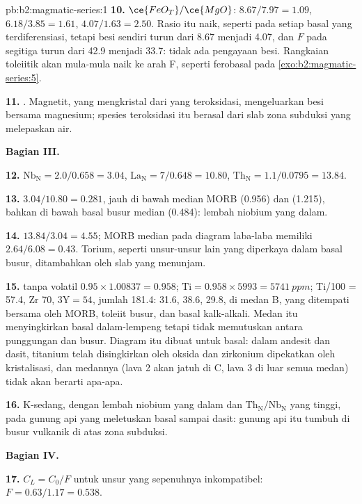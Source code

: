\begin{solution}{pb:b2:magmatic-series:1}
\textbf{10.} $\ce{FeO_T}/\ce{MgO}$: $8.67/7.97 = 1.09$, $6.18/3.85 = 1.61$, $4.07/1.63 =
2.50$. Rasio itu naik, seperti pada setiap basal yang terdiferensiasi, tetapi besi sendiri
turun dari 8.67 menjadi 4.07, dan $F$ pada segitiga turun dari 42.9 menjadi 33.7: tidak ada pengayaan
besi. Rangkaian toleiitik akan mula-mula naik ke arah F, seperti ferobasal pada
\cref{exo:b2:magmatic-series:5}.

\textbf{11.} . Magnetit, yang mengkristal dari  yang teroksidasi,
mengeluarkan besi bersama magnesium; spesies teroksidasi itu berasal dari slab zona subduksi
yang melepaskan air.

\noindent\textbf{Bagian III.}

\textbf{12.} $\mathrm{Nb_N} = 2.0/0.658 = 3.04$, $\mathrm{La_N} = 7/0.648 = 10.80$,
$\mathrm{Th_N} = 1.1/0.0795 = 13.84$.

\textbf{13.} $3.04/10.80 = 0.281$, jauh di bawah median MORB (0.956) dan
 (1.215), bahkan di bawah basal busur median (0.484): lembah
niobium yang dalam.

\textbf{14.} $13.84/3.04 = 4.55$; MORB median pada diagram laba-laba memiliki $2.64/6.08 =
0.43$. Torium, seperti unsur-unsur lain yang diperkaya dalam basal busur, ditambahkan oleh
slab yang menunjam.

\textbf{15.}  tanpa volatil $0.95\times1.00837 = 0.958$; $\mathrm{Ti} =
0.958\times5993 = \qty{5741}{ppm}$; Ti/100 = 57.4, Zr 70, $3\mathrm Y = 54$, jumlah 181.4:
31.6, 38.6, 29.8, di medan B, yang ditempati bersama oleh MORB, toleiit busur, dan basal kalk-alkali.
Medan itu menyingkirkan basal dalam-lempeng tetapi tidak memutuskan antara punggungan dan busur.
Diagram itu dibuat untuk basal: dalam andesit dan dasit, titanium telah disingkirkan
oleh oksida dan zirkonium dipekatkan oleh kristalisasi, dan medannya (lava 2
akan jatuh di C, lava 3 di luar semua medan) tidak akan berarti apa-apa.

\textbf{16.}  K-sedang, dengan lembah niobium yang dalam dan
$\mathrm{Th_N}/\mathrm{Nb_N}$ yang tinggi, pada gunung api yang meletuskan basal sampai dasit: gunung api itu
tumbuh di busur vulkanik di atas zona subduksi.

\noindent\textbf{Bagian IV.}

\textbf{17.} $C_L = C_0/F$ untuk unsur yang sepenuhnya inkompatibel: $F = 0.63/1.17 =
0.538$.


\end{solution}

